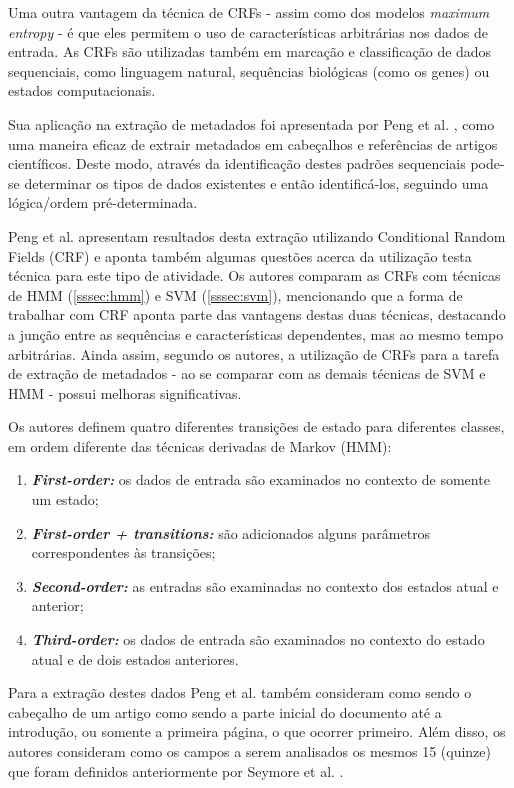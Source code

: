 Uma outra vantagem da técnica de CRFs - assim como dos modelos \emph{maximum entropy} - é que eles permitem o uso de características arbitrárias nos dados de entrada. As CRFs são utilizadas também em marcação e classificação de dados sequenciais, como linguagem natural, sequências biológicas (como os genes) ou estados computacionais.


Sua aplicação na extração de metadados foi apresentada por Peng et al. \cite{Peng-CRF-IE}, como uma maneira eficaz de extrair metadados em cabeçalhos e referências de artigos científicos. Deste modo, através da identificação destes padrões sequenciais pode-se determinar os tipos de dados existentes e então identificá-los, seguindo uma lógica/ordem pré-determinada.

Peng et al. apresentam resultados desta extração utilizando Conditional Random Fields (CRF) e aponta também algumas questões acerca da utilização testa técnica para este tipo de atividade. Os autores comparam as CRFs com técnicas de HMM (\autoref{sssec:hmm}) e SVM (\autoref{sssec:svm}), mencionando que a forma de trabalhar com CRF aponta parte das vantagens destas duas técnicas, destacando a junção entre as sequências e características dependentes, mas ao mesmo tempo arbitrárias. Ainda assim, segundo os autores, a utilização de CRFs para a tarefa de extração de metadados - ao se comparar com as demais técnicas de SVM e HMM - possui melhoras significativas.

Os autores definem quatro diferentes transições de estado para diferentes classes, em ordem diferente das técnicas derivadas de Markov (HMM):

\begin{enumerate}
    \item \emph{\textbf{First-order:}} os dados de entrada são examinados no contexto de somente um estado;
    \item \emph{\textbf{First-order + transitions:}} são adicionados alguns parâmetros correspondentes às transições;
    \item \emph{\textbf{Second-order:}} as entradas são examinadas no contexto dos estados atual e anterior;
    \item \emph{\textbf{Third-order:}} os dados de entrada são examinados no contexto do estado atual e de dois estados anteriores.
\end{enumerate}

Para a extração destes dados Peng et al. \cite{Peng-CRF-IE} também consideram como sendo o cabeçalho de um artigo como sendo a parte inicial do documento até a introdução, ou somente a primeira página, o que ocorrer primeiro. Além disso, os autores consideram como os campos a serem analisados os mesmos 15 (quinze) que foram definidos anteriormente por Seymore et al. \cite{Seymore-HMM-IE}.

